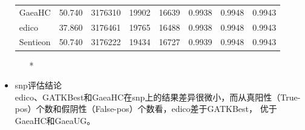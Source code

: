 \documentclass[UTF8,10pt,a4paper]{ctexart}
\begin{document}
\begin{itemize}
\begin{table}[htp]
{\begin{center}
\begin{tabular}{p{1.5cm}|p{1.5cm}|p{1.5cm}|p{1.5cm}|p{1.5cm}|p{1.5cm}|p{1.5cm}|p{1.7cm}}
GaeaHC & 50.740 & 3176310 & 19902 & 16639 & 0.9938 & 0.9948 & 0.9943 \\
edico & 37.860 & 3176461 & 19765 & 16488 & 0.9938 & 0.9948 & 0.9943 \\
Sentieon & 50.740 & 3176222 & 19434 & 16727 & 0.9939 & 0.9948  & 0.9943\\
\hline
\end{tabular}
\end{center}
\label{default}
}
\begin{itemize}
\item[*] {}
\end{itemize}

\end{table}
\item snp评估结论 \\
	edico、GATKBest和GaeaHC在snp上的结果差异很微小，而从真阳性（True-pos）个数和假阴性（False-pos）个数看，edico差于GATKBest， 优于GaeaHC和GaeaUG。
\end{itemize}
\end{document}
